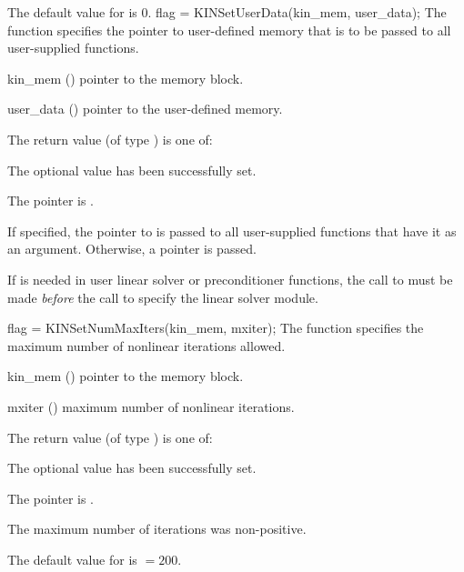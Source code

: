 {
  The default value for  is $0$.
}
{
flag = KINSetUserData(kin\_mem, user\_data);
}
{
  The function  specifies the pointer to user-defined memory
  that is to be passed to all user-supplied functions.
}
{
  \begin{args}
  \item[kin\_mem] ()
    pointer to the {\kinsol} memory block.
  \item[user\_data] ()
    pointer to the user-defined memory.
  \end{args}
}
{
  The return value  (of type ) is one of:
  \begin{args}
  \item[\Id{KIN\_SUCCESS}]
    The optional value has been successfully set.
  \item[\Id{KIN\_MEM\_NULL}]
    The  pointer is .
  \end{args}
}
{
  If specified, the pointer to  is passed to all user-supplied
  functions that have it as an argument. Otherwise, a  pointer is passed.

  {\warn}If  is needed in user linear solver or
  preconditioner functions, the call to
   must be made {\it before} the call to specify the
  linear solver module.
}
{
flag = KINSetNumMaxIters(kin\_mem, mxiter);
}
{
  The function  specifies the maximum number of
  nonlinear iterations allowed.
}
{
  \begin{args}
  \item[kin\_mem] ()
    pointer to the {\kinsol} memory block.
  \item[mxiter] ()
    maximum number of nonlinear iterations.
  \end{args}
}
{
  The return value  (of type ) is one of:
  \begin{args}
  \item[\Id{KIN\_SUCCESS}]
    The optional value has been successfully set.
  \item[\Id{KIN\_MEM\_NULL}]
    The  pointer is .
  \item[\Id{KIN\_ILL\_INPUT}]
    The maximum number of iterations was non-positive.
  \end{args}
}
{
  The default value for  is  $=200$.
}
